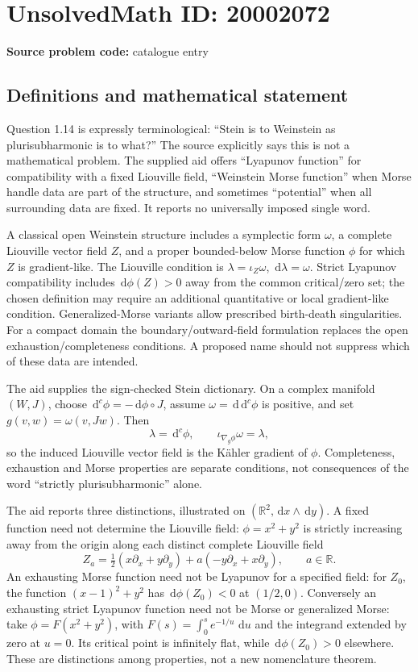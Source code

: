 \documentclass[11pt]{article}
\newcommand{\R}{\mathbb{R}}
\newcommand{\dd}{\,\mathrm{d}}
\begin{document}
\section*{UnsolvedMath ID: 20002072}
\textbf{Source problem code:} catalogue entry
\subsection{Definitions and mathematical statement}
Question 1.14 is expressly terminological: ``Stein is to Weinstein as plurisubharmonic is to what?'' The source explicitly says this is not a mathematical problem. The supplied aid offers ``Lyapunov function'' for compatibility with a fixed Liouville field, ``Weinstein Morse function'' when Morse handle data are part of the structure, and sometimes ``potential'' when all surrounding data are fixed. It reports no universally imposed single word.

A classical open Weinstein structure includes a symplectic form \(\omega\), a complete Liouville vector field \(Z\), and a proper bounded-below Morse function \(\phi\) for which \(Z\) is gradient-like. The Liouville condition is \(\lambda=\iota_Z\omega\), \(\dd\lambda=\omega\). Strict Lyapunov compatibility includes \(\dd\phi(Z)>0\) away from the common critical/zero set; the chosen definition may require an additional quantitative or local gradient-like condition. Generalized-Morse variants allow prescribed birth-death singularities. For a compact domain the boundary/outward-field formulation replaces the open exhaustion/completeness conditions. A proposed name should not suppress which of these data are intended.

The aid supplies the sign-checked Stein dictionary. On a complex manifold \((W,J)\), choose \(\dd^c\phi=-\dd\phi\circ J\), assume \(\omega=\dd\dd^c\phi\) is positive, and set \(g(v,w)=\omega(v,Jw)\). Then
\[
\lambda=\dd^c\phi,\qquad \iota_{\nabla_g\phi}\omega=\lambda,
\]
so the induced Liouville vector field is the K\"ahler gradient of \(\phi\). Completeness, exhaustion and Morse properties are separate conditions, not consequences of the word ``strictly plurisubharmonic'' alone.

The aid reports three distinctions, illustrated on \((\R^2,\dd x\wedge\dd y)\). A fixed function need not determine the Liouville field: \(\phi=x^2+y^2\) is strictly increasing away from the origin along each distinct complete Liouville field
\[
Z_a=\tfrac12(x\partial_x+y\partial_y)+a(-y\partial_x+x\partial_y),\qquad a\in\R.
\]
An exhausting Morse function need not be Lyapunov for a specified field: for \(Z_0\), the function \((x-1)^2+y^2\) has \(\dd\phi(Z_0)<0\) at \((1/2,0)\). Conversely an exhausting strict Lyapunov function need not be Morse or generalized Morse: take \(\phi=F(x^2+y^2)\), with \(F(s)=\int_0^s e^{-1/u}\,\dd u\) and the integrand extended by zero at \(u=0\). Its critical point is infinitely flat, while \(\dd\phi(Z_0)>0\) elsewhere. These are distinctions among properties, not a new nomenclature theorem.
\end{document}
